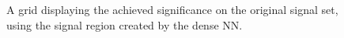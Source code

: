 \begin{figure}
    \caption{A grid displaying the achieved significance on the original signal set, using the signal region 
    created by the dense \ac{NN}.}
    \label{fig:NNGridSig}
\end{figure}
